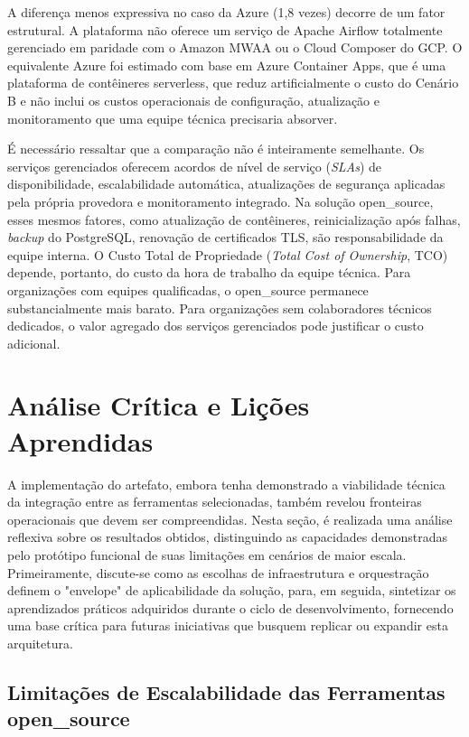 A diferença menos expressiva no caso da Azure (1,8 vezes) decorre de um fator estrutural.
A plataforma não oferece um serviço de Apache Airflow totalmente gerenciado em
paridade com o Amazon MWAA ou o Cloud Composer do GCP. O equivalente Azure foi
estimado com base em Azure Container Apps, que é uma plataforma de contêineres
serverless, que reduz artificialmente o custo do Cenário B e não inclui
os custos operacionais de configuração, atualização e monitoramento que uma equipe
técnica precisaria absorver.

É necessário ressaltar que a comparação não é inteiramente semelhante. Os serviços
gerenciados oferecem acordos de nível de serviço (\textit{SLAs}) de disponibilidade,
escalabilidade automática, atualizações de segurança aplicadas pela própria
provedora e monitoramento integrado. Na solução \acs{open_source}, esses mesmos
fatores, como atualização de contêineres, reinicialização após falhas, \textit{backup}
do PostgreSQL, renovação de certificados TLS, são responsabilidade da equipe
interna. O Custo Total de Propriedade (\textit{Total Cost of Ownership}, TCO)
depende, portanto, do custo da hora de trabalho da equipe técnica. Para
organizações com equipes qualificadas, o \acs{open_source} permanece
substancialmente mais barato. Para organizações sem colaboradores técnicos dedicados,
o valor agregado dos serviços gerenciados pode justificar o custo adicional.

\section{Análise Crítica e Lições Aprendidas}
A implementação do artefato, embora tenha demonstrado a viabilidade técnica da integração entre as ferramentas selecionadas, também revelou fronteiras operacionais que devem ser compreendidas. Nesta seção, é realizada uma análise reflexiva sobre os resultados obtidos, distinguindo as capacidades demonstradas pelo protótipo funcional de suas limitações em cenários de maior escala. Primeiramente, discute-se como as escolhas de infraestrutura e orquestração definem o "envelope" de aplicabilidade da solução, para, em seguida, sintetizar os aprendizados práticos adquiridos durante o ciclo de desenvolvimento, fornecendo uma base crítica para futuras iniciativas que busquem replicar ou expandir esta arquitetura.
\subsection{Limitações de Escalabilidade das Ferramentas \acs{open_source}}

